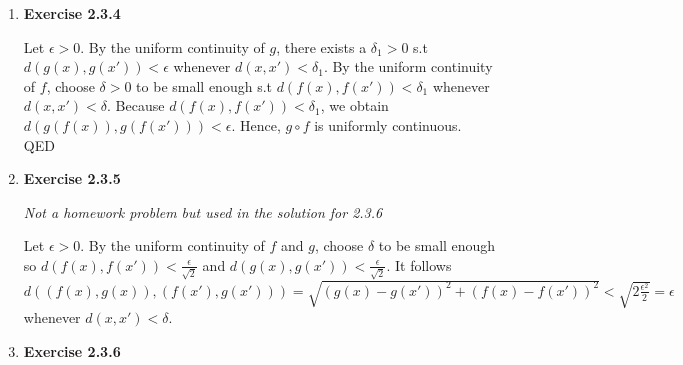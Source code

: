 \documentclass[10pt]{article}
\begin{document}
\begin{enumerate}[label=Problem \arabic*.]
    Then for every $\epsilon>0$ $d(f(x),f(x_0))<\epsilon$ whenever $d(x,x_0)<\delta$ by uniform continuity. Hence, $f$ is continuous.\\
    Let $g(x,y)=x^2+y^2+x-y$.\\
    Let $\epsilon>0$ and choose $\delta=\min\{1,\frac{\epsilon}{2(2+|x_0|+|y_0|)}\}$.
    If $d((x,y),(x_0,y_0))<\delta$ then $|x-x_0|<\delta$ and $|y-y_0|<\delta$.
    It follows $|x+x_0+1||x-x_0|<|x+x_0+1|\delta\le2(|x_0|+1)\delta$ and $|y+y_0-1||y-y_0|<|y+y_0-1|\delta\le2(|y_0|+1)\delta$ by the triangle innequality. 
    Thus, $d(g(x,y),g(x_0,y_0))=|x^2-x_{0}^2+y^2-y_{0}^2+x-x_0-y+y_0|\le|x+x_0+1||x-x_0|+|y+y_0-1||y-y_0|\le 2\delta(2+|x_0|+|y_0|)\le \frac{2(2+|x_0|+|y_0|)\epsilon}{2(2+|x_0|+|y_0|)}<\epsilon$. Hence, $g$ is continuous.\\
    However $|(x+\frac{\sqrt{2\delta}}{2})^2-(x)^2+(y+\frac{\sqrt{2\delta}}{2})^2-(y)^2+(x+\frac{\sqrt{2\delta}}{2})-x+y-(y+\frac{\sqrt{2\delta}}{2})|=|\frac{\sqrt{2\delta}}{2}(2x+\frac{\sqrt{2\delta}}{2})+\frac{\sqrt{2\delta}}{2}(2y+\frac{\sqrt{2\delta}}{2})|=|\sqrt{2\delta}(x+y)+\delta|\ge\epsilon$ whenever $|x+y|$ is sufficiently large.
    Moreover, for every $\delta>0$ there exists a $(x',y')$ within $\delta$ of some $(x,y)$ s.t $d((f(x'),f(y')),(f(x),f(y)))\ge\epsilon$. 
    Hence, $g$ is not uniformly continuous.\\
    QED
    \item \textbf{Exercise 2.3.4}\par
    Let $\epsilon>0$. By the uniform continuity of $g$, there exists a $\delta_1>0$ s.t $d(g(x),g(x'))<\epsilon$ whenever $d(x,x')<\delta_1$. 
    By the uniform continuity of $f$, choose $\delta>0$ to be small enough s.t $d(f(x),f(x'))<\delta_1$ whenever $d(x,x')<\delta$. 
    Because $d(f(x),f(x'))<\delta_1$, we obtain $d(g(f(x)),g(f(x')))<\epsilon$.
    Hence, $g\circ f$ is uniformly continuous.\\
    QED
    \item \textbf{Exercise 2.3.5}\par
    \textit{Not a homework problem but used in the solution for 2.3.6}\par
    Let $\epsilon>0$. By the uniform continuity of $f$ and $g$, choose $\delta$ to be small enough so $d(f(x),f(x'))<\frac{\epsilon}{\sqrt{2}}$ and $d(g(x),g(x'))<\frac{\epsilon}{\sqrt{2}}$.
    It follows $d((f(x),g(x)),(f(x'),g(x')))=\sqrt{(g(x)-g(x'))^2+(f(x)-f(x'))^2}<\sqrt{2\frac{\epsilon^2}{2}}=\epsilon$ whenever $d(x,x')<\delta$.
    \item \textbf{Exercise 2.3.6}\par 

\end{enumerate}
\end{document}
